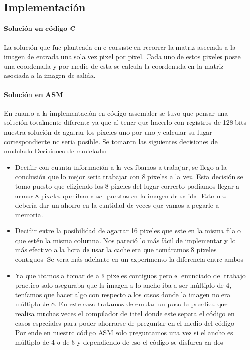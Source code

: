 \subsection{Implementación}
\paragraph{Solución en código C}
La solución que fue planteada en c consiste en recorrer la matriz asociada a la imagen de entrada una sola vez pixel por pixel. Cada uno de estos pixeles posee una coordenada y por medio de esta se calcula la coordenada en la matriz asociada a la imagen de salida. 


\paragraph{Solución en ASM}
En cuanto a la implementación en código assembler se tuvo que pensar una solución totalmente diferente ya que al tener que hacerlo con registros de 128 bits nuestra solución de agarrar los pixeles uno por uno y calcular su lugar correspondiente no seria posible. Se tomaron las siguientes decisiones de modelado Decisiones de modelado:
\begin{itemize}
\item Decidir con cuanta información a la vez íbamos a trabajar, se llego a la conclusión que lo mejor seria trabajar con 8 pixeles a la vez. Esta decisión se tomo puesto que eligiendo los 8 pixeles del lugar correcto podíamos llegar a armar 8 pixeles que iban a ser puestos en la imagen de salida. Esto nos debería dar un ahorro en la cantidad de veces que vamos a pegarle a memoria.
\item Decidir entre la posibilidad de agarrar 16 pixeles que este en la misma fila o que estén la misma columna. Nos pareció lo más fácil de implementar y lo más efectivo a la hora de usar la cache era que tomáramos 8 pixeles contiguos. Se vera más adelante en un experimento la diferencia entre ambos
\item Ya que íbamos a tomar de a 8 pixeles contiguos pero el enunciado del trabajo practico solo aseguraba que la imagen a lo ancho iba a ser múltiplo de 4, teníamos que hacer algo con respecto a los casos donde la imagen no era múltiplo de 8. En este caso tratamos de emular un poco la practica que realiza muchas veces el compilador de intel donde este separa el código en casos especiales para poder ahorrarse de preguntar en el medio del código. Por ende en nuestro código ASM solo preguntamos una vez si el ancho es múltiplo de 4 o de 8 y dependiendo de eso el código se disfurca en dos
\end{itemize}

